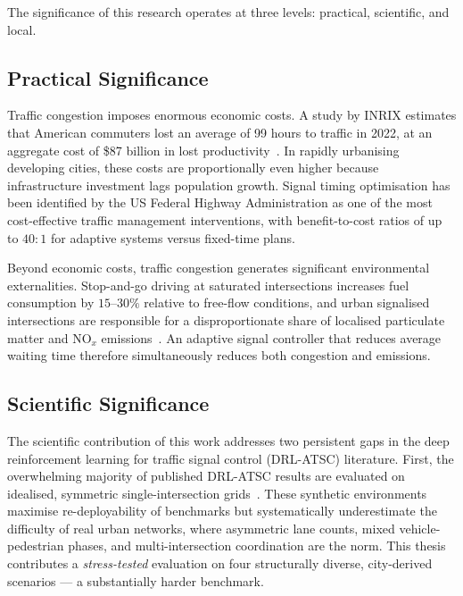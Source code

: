 \documentclass[12pt,oneside,a4paper]{report}
\begin{document}
The significance of this research operates at three levels:
practical, scientific, and local.

\subsection*{Practical Significance}

Traffic congestion imposes enormous economic costs.  A study by
INRIX estimates that American commuters lost an average of 99 hours
to traffic in 2022, at an aggregate cost of \$87 billion in lost
productivity~\cite{haydari2022survey}.  In rapidly urbanising
developing cities, these costs are proportionally even higher because
infrastructure investment lags population growth.  Signal timing
optimisation has been identified by the US Federal Highway
Administration as one of the most cost-effective traffic management
interventions, with benefit-to-cost ratios of up to $40:1$ for
adaptive systems versus fixed-time plans.

Beyond economic costs, traffic congestion generates significant
environmental externalities.  Stop-and-go driving at saturated
intersections increases fuel consumption by $15$--$30\%$ relative
to free-flow conditions, and urban signalised intersections are
responsible for a disproportionate share of localised particulate
matter and $\mathrm{NO}_x$ emissions~\cite{haydari2022survey}.
An adaptive signal controller that reduces average waiting time
therefore simultaneously reduces both congestion and emissions.

\subsection*{Scientific Significance}

The scientific contribution of this work addresses two persistent
gaps in the deep reinforcement learning for traffic signal control
(DRL-ATSC) literature.  First, the overwhelming majority of
published DRL-ATSC results are evaluated on idealised, symmetric
single-intersection grids~\cite{intellilight2018, presslight2019,
mplight2020}.  These synthetic environments maximise re-deployability
of benchmarks but systematically underestimate the difficulty of
real urban networks, where asymmetric lane counts, mixed
vehicle-pedestrian phases, and multi-intersection coordination are
the norm.  This thesis contributes a \emph{stress-tested} evaluation
on four structurally diverse, city-derived scenarios --- a
substantially harder benchmark.
\end{document}
